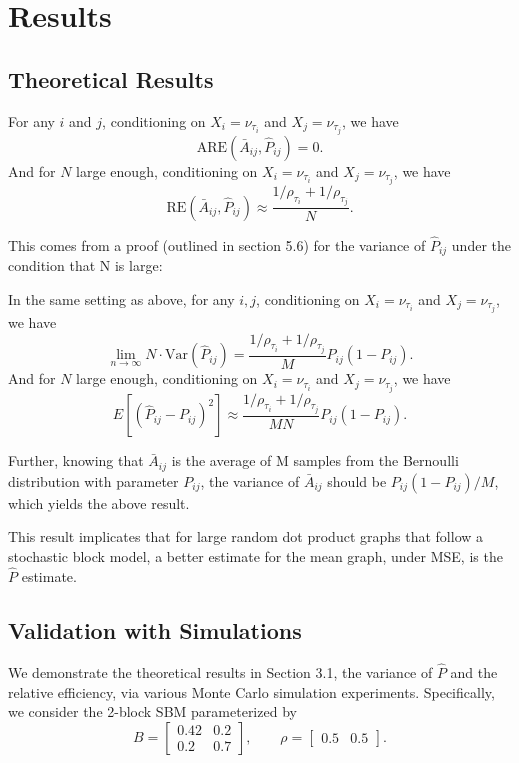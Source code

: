 \section{Results}
\label{section:results}

\subsection{Theoretical Results}
\label{subsection:theoretical_results}

\begin{theorem}
\label{thm:ARE}
For any $i$ and $j$, conditioning on $X_i = \nu_{\tau_i}$ and $X_j = \nu_{\tau_j}$, we have
\[
	\mathrm{ARE}(\bar{A}_{ij}, \hat{P}_{ij}) = 0.
\]
And for $N$ large enough, conditioning on $X_i = \nu_{\tau_i}$ and $X_j = \nu_{\tau_j}$, we have
\[
	\mathrm{RE}(\bar{A}_{ij}, \hat{P}_{ij}) \approx
    \frac{1/\rho_{\tau_i} + 1/\rho_{\tau_j}}{N}.
\]
\end{theorem}
This comes from a proof (outlined in section 5.6) for the variance of $\hat{P}_{ij}$ under the condition that N is large:
\begin{lemma}
\label{lm:VarPhat}
In the same setting as above, for any $i, j$, conditioning on $X_i = \nu_{\tau_i}$ and $X_j = \nu_{\tau_j}$, we have
\[
	\lim_{n \to \infty} N \cdot \mathrm{Var}(\hat{P}_{ij}) =
    \frac{1/\rho_{\tau_i} + 1/\rho_{\tau_j}}{M} P_{ij} (1 - P_{ij}).
\]
And for $N$ large enough, conditioning on $X_i = \nu_{\tau_i}$ and $X_j = \nu_{\tau_j}$, we have
\[
	E[(\hat{P}_{ij} - P_{ij})^2] \approx
    \frac{1/\rho_{\tau_i} + 1/\rho_{\tau_j}}{M N} P_{ij}(1-P_{ij}).
\]
\end{lemma}
Further, knowing that $\bar{A}_{ij}$ is the average of M samples from the Bernoulli distribution with parameter $P_{ij}$, the variance of $\bar{A}_{ij}$ should be $P_{ij}(1-P_{ij})/M$, which yields the above result.

This result implicates that for large random dot product graphs that follow a stochastic block model, a better estimate for the mean graph, under MSE, is the $\hat{P}$ estimate.


\subsection{Validation with Simulations}
\label{subsection:simulations}
We demonstrate the theoretical results in Section 3.1, the variance of $\hat{P}$ and the relative efficiency, via various Monte Carlo simulation experiments. Specifically, we consider the 2-block SBM parameterized by
\begin{equation*}
B = \begin{bmatrix}
0.42 & 0.2 \\
0.2 & 0.7
\end{bmatrix}
,\qquad \rho = \begin{bmatrix}
0.5 & 0.5
\end{bmatrix}.
\end{equation*}

